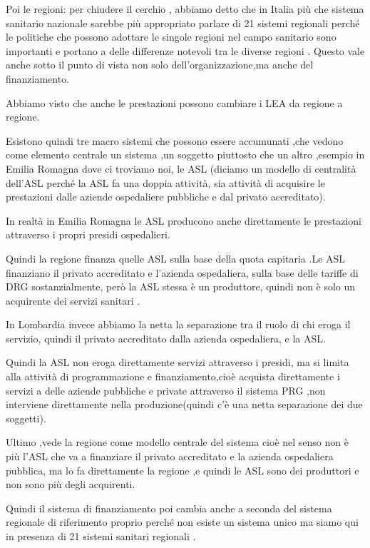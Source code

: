 Poi le regioni: per chiudere il cerchio , abbiamo detto che in Italia
più che sistema sanitario nazionale sarebbe più appropriato parlare di
21 sistemi regionali perché le politiche che possono adottare le singole
regioni nel campo sanitario sono importanti e portano a delle differenze
notevoli tra le diverse regioni . Questo vale anche sotto il punto di
vista non solo dell'organizzazione,ma anche del finanziamento.

Abbiamo visto che anche le prestazioni possono cambiare i LEA da regione
a regione.

Esistono quindi tre macro sistemi che possono essere accumunati ,che
vedono come elemento centrale un sistema ,un soggetto piuttosto che un
altro ,esempio in Emilia Romagna dove ci troviamo noi, le ASL (diciamo
un modello di centralità dell'ASL perché la ASL fa una doppia attività,
sia attività di acquisire le prestazioni dalle aziende ospedaliere
pubbliche e dal privato accreditato).

In realtà in Emilia Romagna le ASL producono anche direttamente le
prestazioni attraverso i propri presidi ospedalieri.

Quindi la regione finanza quelle ASL sulla base della quota capitaria
.Le ASL finanziano il privato accreditato e l'azienda ospedaliera, sulla
base delle tariffe di DRG sostanzialmente, però la ASL stessa è un
produttore, quindi non è solo un acquirente dei servizi sanitari .

In Lombardia invece abbiamo la netta la separazione tra il ruolo di chi
eroga il servizio, quindi il privato accreditato dalla azienda
ospedaliera, e la ASL.

Quindi la ASL non eroga direttamente servizi attraverso i presidi, ma si
limita alla attività di programmazione e finanziamento,cioè acquista
direttamente i servizi a delle aziende pubbliche e private attraverso il
sistema PRG ,non interviene direttamente nella produzione(quindi c'è una
netta separazione dei due soggetti).

Ultimo ,vede la regione come modello centrale del sistema cioè nel senso
non è più l'ASL che va a finanziare il privato accreditato e la azienda
ospedaliera pubblica, ma lo fa direttamente la regione ,e quindi le ASL
sono dei produttori e non sono più degli acquirenti.

Quindi il sistema di finanziamento poi cambia anche a seconda del
sistema regionale di riferimento proprio perché non esiste un sistema
unico ma siamo qui in presenza di 21 sistemi sanitari regionali .

